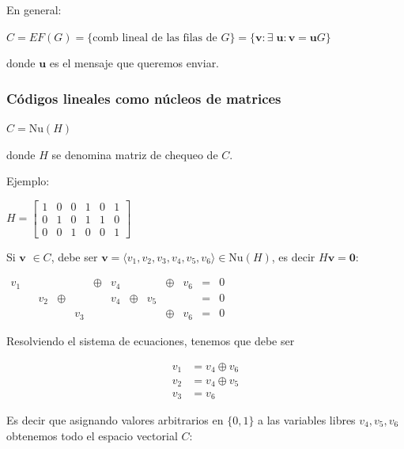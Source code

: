 \documentclass[10pt,a4paper]{article}
\begin{document}
En general:

\begin{center}
$C = EF(G) = \{\text{comb lineal de las filas de } G\} = \{\textbf{v}: \exists \;\textbf{u} : \textbf{v} = \textbf{u} G\}$
\end{center}

donde $\textbf{u}$ es el mensaje que queremos enviar.

\subsubsection*{Códigos lineales como núcleos de matrices}

\begin{center}
$C = \text{Nu}(H)$
\end{center}

donde $H$ se denomina matriz de chequeo de $C$.

Ejemplo:

\begin{center}
$H = \left[ \begin{array}{cccccc} 1&0&0&1&0&1\\ 0&1&0&1&1&0\\ 0&0&1&0&0&1 \end{array} \right]$
\end{center}

Si $\textbf{v}$ $\in C$, debe ser $\textbf{v}=\langle v_1, v_2, v_3, v_4, v_5, v_6\rangle \in \text{Nu}(H)$, es decir $H\textbf{v} = \textbf{0}$:

\begin{center}
$ \begin{array}{cccccccccccccc} v_1 & &&&& \oplus &v_4 && &\oplus & v_6 & = & 0\\ & &v_2&\oplus &&& v_4&\oplus &v_5&&&=&0\\&&&&v_3&&&&&\oplus&v_6&=&0 \end{array}$
\end{center}

Resolviendo el sistema de ecuaciones, tenemos que debe ser

\begin{center}
\begin{align*} v_1 &= v_4 \oplus v_6\\ v_2 &= v_4 \oplus v_5\\ v_3 &= v_6 \end{align*}
\end{center}

Es decir que asignando valores arbitrarios en $\{0, 1\}$ a las variables libres $v_4, v_5, v_6$ obtenemos todo el espacio vectorial $C$:
\end{document}

